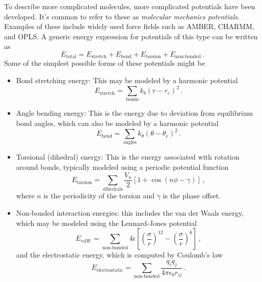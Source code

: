 \documentclass{article}
\theoremstyle{plain}\theoremheaderfont{\normalfont\itshape}\theorembodyfont{\rmfamily}\theoremseparator{.}\newtheorem*{rem}{Remark}\newtheorem*{ex}{Example}\newtheorem*{proof}{Proof}\newtheorem*{altp}{Alternative proof}
\theoremstyle{plain}\theoremheaderfont{\normalfont\bfseries}\theorembodyfont{\rmfamily}\theoremseparator{.}\newtheorem{thm}{Theorem}[section]\newtheorem{lem}[thm]{Lemma}\newtheorem{prop}[thm]{Proposition}\newtheorem*{cor}{Corollary}\newtheorem{defn}[thm]{Definition}\newtheorem{clm}[thm]{Claim}\newtheorem{clminproof}{Claim}\newtheorem{pos}{Postulate}[section]
\theoremstyle{break}\theoremheaderfont{\normalfont\itshape}\theorembodyfont{\rmfamily}\theoremseparator{.\medskip}\newtheorem*{proofskip}{Proof}\newtheorem*{exs}{Examples}\newtheorem*{rems}{Remarks}
\theoremstyle{break}\theoremheaderfont{\normalfont\bfseries}\theorembodyfont{\rmfamily}\theoremseparator{.\medskip}\newtheorem{lemskip}[thm]{Lemma}\newtheorem{defnskip}[thm]{Definition}\newtheorem{propskip}[thm]{Proposition}\newtheorem{thmskip}[thm]{Theorem}
\numberwithin{equation}{section}
\begin{document}
    To describe more complicated molecules, more complicated potentials have been developed. It's common to refer to these as \textit{molecular mechanics potentials}. Examples of these include widely used force fields such as AMBER, CHARMM, and OPLS. A generic energy expression for potentials of this type can be written as
    \begin{equation}
        E_{\text{total}}=E_{\text{stretch}}+E_{\text{bend}}+E_{\text{torsion}}+E_{\text{non-bonded}}\,.
    \end{equation}
    Some of the simplest possible forms of these potentials might be
    \begin{itemize}[topsep=0pt]
        \item Bond stretching energy: This may be modeled by a harmonic potential
        \begin{equation}
            E_{\text{stretch}}=\sum_{\text{bonds}}k_b(r-r_e)^2\,.
        \end{equation}
        \item Angle bending energy: This is the energy due to deviation from equilibrium bond angles, which can also be modeled by a harmonic potential
        \begin{equation}
            E_{\text{bend}}=\sum_{\text{angles}}k_\theta(\theta-\theta_e)^2\,.
        \end{equation}
        \item Torsional (dihedral) energy: This is the energy associated with rotation around bonds, typically modeled using a periodic potential function
        \begin{equation}
            E_{\text{torsion}}=\sum_{\text{dihedrals}}\frac{V_n}{2}[1+\cos(n\phi-\gamma)]\,,
        \end{equation}
        where \(n\) is the periodicity of the torsion and \(\gamma\) is the phase offset.
        \item Non-bonded interaction energies: this includes the van der Waals energy, which may be modeled using the Lennard-Jones potential
        \begin{equation}
            E_{\text{vdW}}=\sum_{\text{non-bonded}}4\epsilon\left[\left(\frac{\sigma}{r}\right)^{12}-\left(\frac{\sigma}{r}\right)^6\right]\,,
        \end{equation}
        and the electrostatic energy, which is computed by Coulomb's law
        \begin{equation}
            E_{\text{electrostatic}}=\sum_{\text{non-bonded}}\frac{q_iq_j}{4\pi\epsilon_0 r_{ij}}\,.
        \end{equation}
    \end{itemize}
\end{document}
